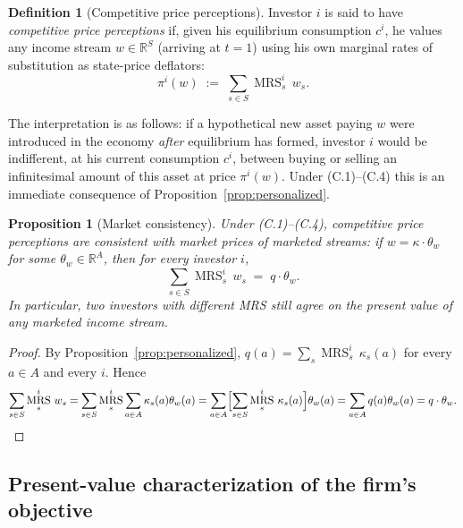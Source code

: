\documentclass[11pt,a4paper]{article}
\def\R{\mathbb{R}}
\DeclareMathOperator{\MRS}{MRS}
\theoremstyle{plain}
\newtheorem{proposition}[theorem]{Proposition}
\theoremstyle{definition}
\newtheorem{definition}[theorem]{Definition}
\theoremstyle{remark}
\begin{document}
\begin{definition}[Competitive price perceptions]\label{def:cpp}
Investor $i$ is said to have \emph{competitive price perceptions} if, given his equilibrium consumption $c^i$, he values any income stream $w\in\R^S$ (arriving at $t=1$) using his own marginal rates of substitution as state-price deflators:
\begin{equation}\label{eq:cpp}
  \pi^i(w) \;:=\; \sum_{s\in S} \MRS^i_s\,w_s.
\end{equation}
\end{definition}

The interpretation is as follows: if a hypothetical new asset paying $w$ were introduced in the economy \emph{after} equilibrium has formed, investor $i$ would be indifferent, at his current consumption $c^i$, between buying or selling an infinitesimal amount of this asset at price $\pi^i(w)$. Under (C.1)--(C.4) this is an immediate consequence of Proposition~\ref{prop:personalized}.

\begin{proposition}[Market consistency]\label{prop:market-consistency}
Under \textup{(C.1)--(C.4)}, competitive price perceptions are consistent with market prices of \emph{marketed} streams: if $w=\kappa\cdot\theta_w$ for some $\theta_w\in\R^A$, then for every investor $i$,
\begin{equation}\label{eq:market-consistency}
  \sum_{s\in S}\MRS^i_s\,w_s \;=\; q\cdot\theta_w.
\end{equation}
In particular, two investors with different MRS still agree on the present value of any marketed income stream.
\end{proposition}

\begin{proof}
By Proposition~\ref{prop:personalized}, $q(a) = \sum_s \MRS^i_s\,\kappa_s(a)$ for every $a\in A$ and every $i$. Hence
\[
  \sum_{s\in S}\MRS^i_s\,w_s
  = \sum_{s\in S}\MRS^i_s \sum_{a\in A}\kappa_s(a)\theta_w(a)
  = \sum_{a\in A}\Bigl[\sum_{s\in S}\MRS^i_s\,\kappa_s(a)\Bigr]\theta_w(a)
  = \sum_{a\in A}q(a)\theta_w(a) = q\cdot\theta_w.\qedhere
\]
\end{proof}

\subsection{Present-value characterization of the firm's objective}
\end{document}
